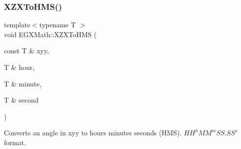 \mbox{\label{group___e_g_x_math-_angle_conversions-_x_z_x_ga3f52a8fe8ff0da0ebf9f05bb482b6a17}} 
\subsubsection{\texorpdfstring{X\+Z\+X\+To\+H\+M\+S()}{XZXToHMS()}}
{\footnotesize\ttfamily template$<$typename T $>$ \\
void E\+G\+X\+Math\+::\+X\+Z\+X\+To\+H\+MS (\begin{DoxyParamCaption}\item[{const T \&}]{xyy,  }\item[{T \&}]{hour,  }\item[{T \&}]{minute,  }\item[{T \&}]{second }\end{DoxyParamCaption})}



Converts an angle in xyy to hours minutes seconds (H\+MS). ${HH}^h{MM}^m{SS.SS}^s$ format. 

